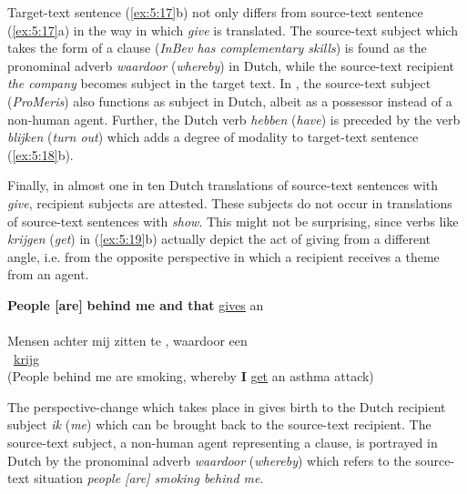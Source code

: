 \documentclass[output=paper]{LSP/langsci}
\begin{document}
Target-text sentence (\ref{ex:5:17}b) not only differs from source-text sentence (\ref{ex:5:17}a) in the way in which \textit{give} is translated. The source-text subject which takes the form of a clause (\textit{InBev has complementary skills}) is found as the pronominal adverb \textit{waardoor} (\textit{whereby}) in Dutch, while the source-text recipient \textit{the company} becomes subject in the target text. In , the source-text subject (\textit{ProMeris}) also functions as subject in Dutch, albeit as a possessor instead of a non-human agent. Further, the Dutch verb \textit{hebben} (\textit{have}) is preceded by the verb \textit{blijken} (\textit{turn out}) which adds a degree of modality to target-text sentence (\ref{ex:5:18}b). 

Finally, in almost one in ten Dutch translations of source-text sentences with \textit{give}, recipient subjects are attested. These subjects do not occur in translations of source-text sentences with \textit{show}. This might not be surprising, since verbs like \textit{krijgen} (\textit{get}) in (\ref{ex:5:19}b) actually depict the act of giving from a different angle, i.e. from the opposite perspective in which a recipient receives a theme from an agent.   

\ea \label{ex:5:19}
\ea
\textbf{People [are]}  \textbf{behind me and that} \ul{gives}  an\\\,  \\[1em]
\ex
Mensen achter mij zitten te , waardoor  een\\	\,  \ul{krijg}\\
(People behind me are smoking, whereby \textbf{I} \ul{get} an asthma attack)
\z
\z


The perspective-change which takes place in  gives birth to the Dutch recipient subject \textit{ik} (\textit{me}) which can be brought back to the source-text recipient. The source-text subject, a non-human agent representing a clause, is portrayed in Dutch by the pronominal adverb \textit{waardoor} (\textit{whereby}) which refers to the source-text situation \textit{people [are] smoking behind me}.
  
\end{document}
